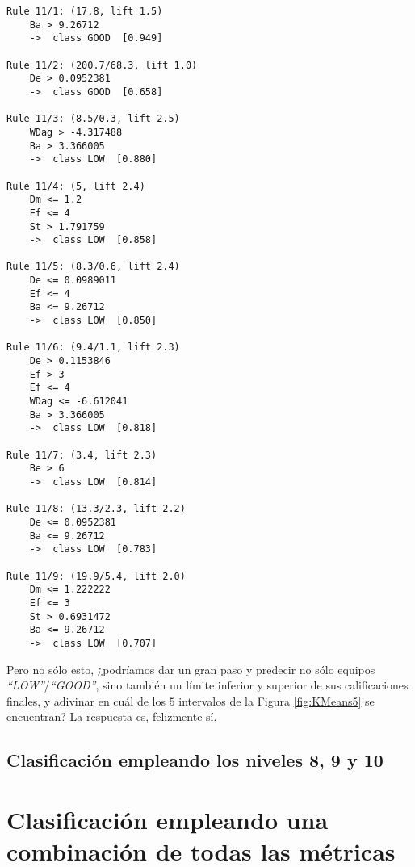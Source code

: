 \begin{tcolorbox}[title=Reglas de clasificación para identificar grupos de tipo \emph{``LOW''}.]
  \makeatletter
  \makeatother
\begin{multicols}{2}
    \begin{verbatim}
Rule 11/1: (17.8, lift 1.5)
	Ba > 9.26712
	->  class GOOD  [0.949]

Rule 11/2: (200.7/68.3, lift 1.0)
	De > 0.0952381
	->  class GOOD  [0.658]

Rule 11/3: (8.5/0.3, lift 2.5)
	WDag > -4.317488
	Ba > 3.366005
	->  class LOW  [0.880]

Rule 11/4: (5, lift 2.4)
	Dm <= 1.2
	Ef <= 4
	St > 1.791759
	->  class LOW  [0.858]

Rule 11/5: (8.3/0.6, lift 2.4)
	De <= 0.0989011
	Ef <= 4
	Ba <= 9.26712
	->  class LOW  [0.850]

Rule 11/6: (9.4/1.1, lift 2.3)
	De > 0.1153846
	Ef > 3
	Ef <= 4
	WDag <= -6.612041
	Ba > 3.366005
	->  class LOW  [0.818]

Rule 11/7: (3.4, lift 2.3)
	Be > 6
	->  class LOW  [0.814]

Rule 11/8: (13.3/2.3, lift 2.2)
	De <= 0.0952381
	Ba <= 9.26712
	->  class LOW  [0.783]

Rule 11/9: (19.9/5.4, lift 2.0)
	Dm <= 1.222222
	Ef <= 3
	St > 0.6931472
	Ba <= 9.26712
	->  class LOW  [0.707]
    \end{verbatim}
  \end{multicols}
\label{rules2}
\end{tcolorbox}

Pero no sólo esto, ¿podríamos dar un gran paso y predecir no sólo equipos \emph{``LOW''}/\emph{``GOOD''}, sino también un límite inferior y superior de sus calificaciones finales, y adivinar en cuál de los $5$ intervalos de la Figura \ref{fig:KMeans5} se encuentran? La respuesta es, felizmente sí.

\subsection{Clasificación empleando los niveles 8, 9 y 10}


\section{Clasificación empleando una combinación de todas las métricas}

